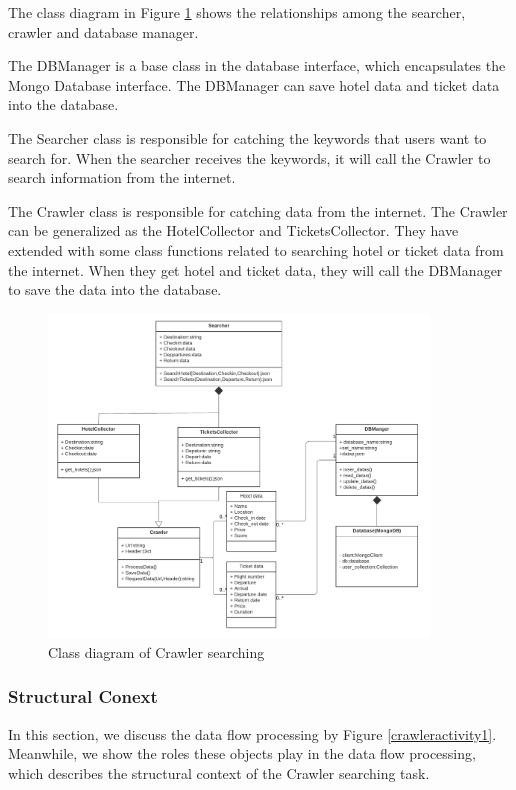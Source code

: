 \documentclass[conference]{IEEEtran}
\begin{document}
The class diagram in Figure \ref{crawlerclass1} shows the relationships among the searcher, crawler and database manager. 

The DBManager is a base class in the database interface, which encapsulates the Mongo Database interface. The DBManager can save hotel data and ticket data into the database.

The Searcher class is responsible for catching the keywords that users want to search for. When the searcher receives the keywords, it will call the Crawler to search information from the internet.

The Crawler class is responsible for catching data from the internet. The Crawler can be generalized as the HotelCollector and TicketsCollector. They have extended with some class functions related to searching hotel or ticket data from the internet.  When they get hotel and ticket data, they will call the DBManager to save the data into the database.
\begin{figure}[htbp]
	\centerline{\includegraphics[width=0.9\textwidth]{image/crawler search class1.pdf}}
	\caption{Class diagram of Crawler searching }
	\label{crawlerclass1}
\end{figure}

\subsubsection{\textbf{Structural Conext }}
\textbf{}

In this section, we discuss the data flow processing by Figure \ref{crawleractivity1}. Meanwhile, we show the roles these objects play in the data flow processing, which describes the structural context of the Crawler searching task.
\end{document}
